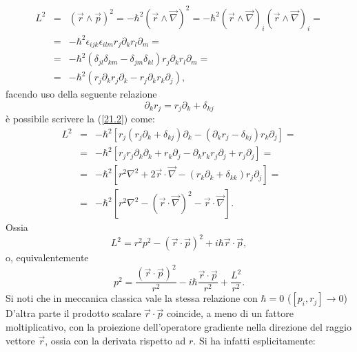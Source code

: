 \begin{eqnarray} 
\label{21.2}
L^2 & =&\left(\vec{r}\wedge\vec{p}\right)^2=-\hbar^2\left(\vec{r}\wedge\vec{\nabla}\right)^2=-\hbar^2\left(\vec{r}\wedge\vec{\nabla}\right)_i\left(\vec{r}\wedge\vec{\nabla}\right)_i= \nonumber \\
 & =& -\hbar^2\epsilon_{ijk}\epsilon_{ilm}r_j\partial_k r_l\partial_m= \nonumber \\
 & =&-\hbar^2\left(\delta_{jl}\delta_{km}-\delta_{jm}\delta_{kl}\right)r_j\partial_k r_l\partial_m=\nonumber \\
 & =&-\hbar^2\left(r_j\partial_kr_j\partial_k-r_j\partial_kr_k\partial_j\right) ,
\end{eqnarray}
facendo uso della seguente relazione
\begin{equation}
\partial_kr_j=r_j\partial_k+\delta_{kj}
\end{equation}
è possibile scrivere la (\ref{21.2}) come:
\begin{eqnarray}
L^2&=&-\hbar^2\left[r_j\left(r_j\partial_k+\delta_{kj}\right)\partial_k-\left(\partial_kr_j-\delta_{kj}\right)r_k\partial_j\right]= \nonumber\\
&=&-\hbar^2\left[r_jr_j\partial_k\partial_k+r_k\partial_j-\partial_kr_kr_j\partial_j+r_j\partial_j\right]= \nonumber \\
&=&-\hbar^2\left[r^2\nabla^2+2\vec{r}\cdot\vec{\nabla}-\left(r_k\partial_k+\delta_{kk}\right)r_j\partial_j\right]= \nonumber\\
&=&-\hbar^2\left[r^2\nabla^2-\left(\vec{r}\cdot\vec{\nabla}\right)^2-\vec{r}\cdot\vec{\nabla}\right].
\end{eqnarray}
Ossia
\begin{equation}
L^2=r^2p^2-\left(\vec{r}\cdot\vec{p}\right)^2+i\hbar\vec{r}\cdot\vec{p} ,
\end{equation}
o, equivalentemente
\begin{equation}
\label{21.3}
p^2=\frac{\left(\vec{r}\cdot\vec{p}\right)^2}{r^2}-i\hbar\frac{\vec{r}\cdot\vec{p}}{r^2}+\frac{L^2}{r^2}.
\end{equation}
Si noti che in meccanica classica vale la stessa relazione con $\hbar=0$ ($\left[p_i,r_j\right]\rightarrow0$)\\
D'altra parte il prodotto scalare $\vec{r}\cdot\vec{p}$ coincide, a meno di un fattore moltiplicativo, con la proiezione dell'operatore gradiente nella direzione del raggio vettore $\vec{r}$, ossia con la derivata rispetto ad $r$. Si ha infatti esplicitamente:

